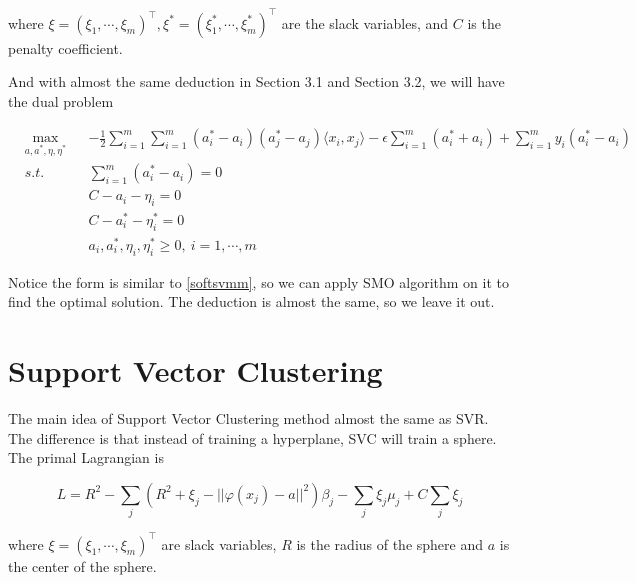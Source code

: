 \documentclass[a4paper]{report}
\begin{document}
where $\xi=(\xi_1,\cdots,\xi_m)^\top,\xi^*=(\xi_1^*,\cdots,\xi_m^*)^\top$ are the slack variables, and $C$ is the penalty coefficient.

And with almost the same deduction in Section 3.1 and Section 3.2, we will have the dual problem

\begin{align*}
    &\max_{a,a^*,\eta,\eta^*} && -\frac{1}{2}\sum_{i=1}^m\sum_{i=1}^m(a_i^*-a_i)(a_j^*-a_j)\langle x_i,x_j\rangle -\epsilon \sum_{i=1}^m (a_i^*+a_i) + \sum_{i=1}^my_i(a_i^*-a_i) \\
    &s.t. &&\sum_{i=1}^m(a_i^*-a_i)=0 \\
    & &&C-a_i-\eta_i=0 \\
    & &&C-a_i^*-\eta_i^*=0 \\
    & && a_i,a_i^*,\eta_i,\eta_i^*\geq 0,\ i=1,\cdots,m
\end{align*}


Notice the form is similar to \ref{softsvmm}, so we can apply SMO algorithm on it to find the optimal solution. The deduction is almost the same, so we leave it out.

\section{Support Vector Clustering}

The main idea of Support Vector Clustering method\cite{ben2001support} almost the same as SVR. The difference is that instead of training a hyperplane, SVC will train a sphere. The primal Lagrangian is

\[
    L=R^2-\sum_j (R^2+\xi_j-||\varphi(x_j)-a||^2)\beta_j-\sum_j\xi_j\mu_j+C\sum_j\xi_j
\]

where $\xi=(\xi_1,\cdots,\xi_m)^\top$ are slack variables, $R$ is the radius of the sphere and $a$ is the center of the sphere.
\end{document}
